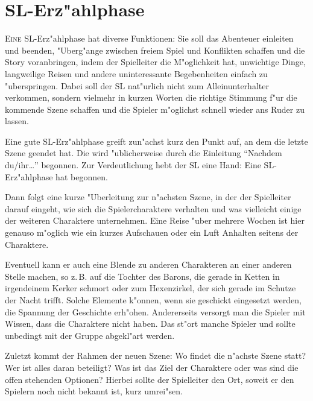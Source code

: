\chapter{SL-Erz"ahlphase}\label{Ch:SLErzaehlphase}
\lettrine{E}{ine}
SL-Erz"ahlphase hat diverse Funktionen: Sie soll das Abenteuer einleiten und beenden, "Uberg"ange zwischen freiem Spiel und Konflikten schaffen und die Story voranbringen, indem der Spielleiter die M"oglichkeit hat, unwichtige Dinge, langweilige Reisen und andere uninteressante Begebenheiten einfach zu "uberspringen. Dabei soll der SL nat"urlich nicht zum Alleinunterhalter verkommen, sondern vielmehr in kurzen Worten die richtige Stimmung f"ur die kommende Szene schaffen und die Spieler m"oglichst schnell wieder ans Ruder zu lassen.

Eine gute SL-Erz"ahlphase greift zun"achst kurz den Punkt auf, an dem die letzte Szene geendet hat. Die wird "ublicherweise durch die Einleitung ``Nachdem du/ihr\dots'' begonnen. Zur Verdeutlichung hebt der SL eine Hand: Eine SL-Erz"ahlphase hat begonnen.

Dann folgt eine kurze "Uberleitung zur n"achsten Szene, in der der Spielleiter darauf eingeht, wie sich die Spielercharaktere verhalten und was vielleicht einige der weiteren Charaktere unternehmen. Eine Reise "uber mehrere Wochen ist hier genauso m"oglich wie ein kurzes Aufschauen oder ein Luft Anhalten seitens der Charaktere.

Eventuell kann er auch eine Blende zu anderen Charakteren an einer anderen Stelle machen, so z.\,B. auf die Tochter des Barons, die gerade in Ketten in irgendeinem Kerker schmort oder zum Hexenzirkel, der sich gerade im Schutze der Nacht trifft. Solche Elemente k"onnen, wenn sie geschickt eingesetzt werden, die Spannung der Geschichte erh"ohen. Andererseits versorgt man die Spieler mit Wissen, dass die Charaktere nicht haben. Das st"ort manche Spieler und sollte unbedingt mit der Gruppe abgekl"art werden.

Zuletzt kommt der Rahmen der neuen Szene: Wo findet die n"achste Szene statt? Wer ist alles daran beteiligt? Was ist das Ziel der Charaktere oder was sind die offen stehenden Optionen? Hierbei sollte der Spielleiter den Ort, soweit er den Spielern noch nicht bekannt ist, kurz umrei"sen.


